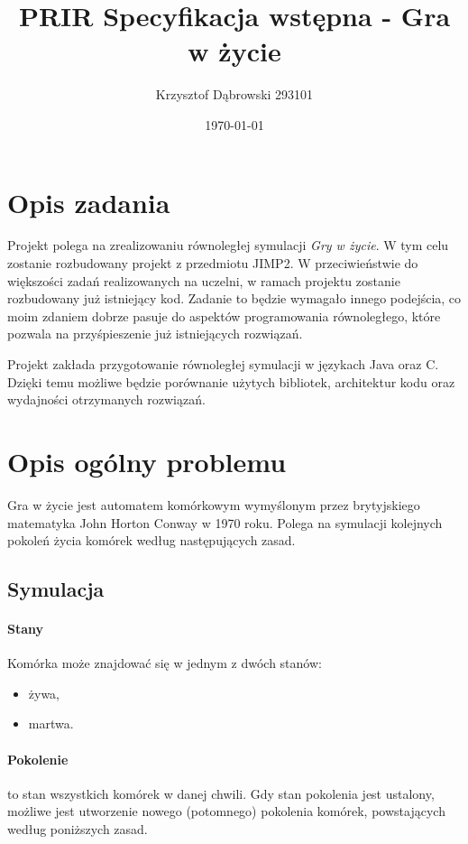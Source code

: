 \documentclass{mwart}
\title{PRIR Specyfikacja wstępna - Gra w życie}
\author{Krzysztof Dąbrowski 293101}
\date{\today}
\begin{document}
\maketitle{}

\tableofcontents{}

\section{Opis zadania}
Projekt polega na zrealizowaniu równoległej symulacji \textit{Gry w życie}.
W tym celu zostanie rozbudowany projekt z przedmiotu JIMP2. 
W przeciwieństwie do większości zadań realizowanych na uczelni, w ramach projektu zostanie rozbudowany już istniejący kod.
Zadanie to będzie wymagało innego podejścia, co moim zdaniem dobrze pasuje do aspektów programowania równoległego, które pozwala na przyśpieszenie już istniejących rozwiązań.

Projekt zakłada przygotowanie równoległej symulacji w językach Java oraz C.
Dzięki temu możliwe będzie porównanie użytych bibliotek, architektur kodu oraz wydajności otrzymanych rozwiązań.

\section{Opis ogólny problemu}
Gra w życie jest automatem komórkowym wymyślonym przez brytyjskiego matematyka John Horton Conway
w 1970 roku. Polega na symulacji kolejnych pokoleń życia komórek według następujących zasad.

\subsection{Symulacja}

\paragraph{Stany} Komórka może znajdować się w jednym z dwóch stanów:
\begin{itemize}
\item żywa,
\item martwa.
\end{itemize}

\paragraph{Pokolenie} to stan wszystkich komórek w danej chwili. Gdy stan pokolenia jest ustalony, możliwe jest utworzenie nowego (potomnego) pokolenia komórek, powstających według poniższych zasad.
\end{document}
